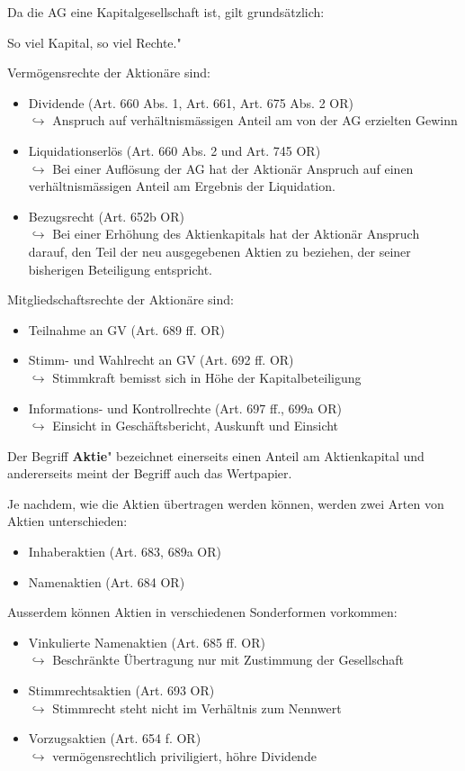 \documentclass[12pt]{article}
\begin{document}
Da die AG eine Kapitalgesellschaft ist, gilt grundsätzlich: 
\begin{center}
    \glqq So viel Kapital, so viel Rechte."
\end{center}
Vermögensrechte der Aktionäre sind:
\begin{itemize}
    \item Dividende (Art. 660 Abs. 1, Art. 661, Art. 675 Abs. 2 OR)\\
    $\hookrightarrow$ Anspruch auf verhältnismässigen Anteil am von der AG erzielten Gewinn
    \item Liquidationserlös (Art. 660 Abs. 2 und Art. 745 OR)\\
    $\hookrightarrow$ Bei einer Auflösung der AG hat der Aktionär Anspruch auf einen verhältnismässigen Anteil am Ergebnis der Liquidation.
    \item Bezugsrecht (Art. 652b OR)\\
    $\hookrightarrow$ Bei einer Erhöhung des Aktienkapitals hat der Aktionär Anspruch darauf, den Teil der neu ausgegebenen Aktien zu beziehen, der seiner bisherigen Beteiligung entspricht.
\end{itemize}
\newpage
Mitgliedschaftsrechte der Aktionäre sind:
\begin{itemize}
    \item Teilnahme an GV (Art. 689 ff. OR)
    \item Stimm- und Wahlrecht an GV (Art. 692 ff. OR)\\
    $\hookrightarrow$ Stimmkraft bemisst sich in Höhe der Kapitalbeteiligung
    \item Informations- und Kontrollrechte (Art. 697 ff., 699a OR)\\
    $\hookrightarrow$ Einsicht in Geschäftsbericht, Auskunft und Einsicht
\end{itemize}
\begin{Definitionsbox}
    Der Begriff \glqq\textbf{Aktie}" bezeichnet einerseits einen Anteil am Aktienkapital und andererseits meint der Begriff auch das Wertpapier.
\end{Definitionsbox}
Je nachdem, wie die Aktien übertragen werden können, werden zwei Arten von Aktien unterschieden:
\begin{itemize}
    \item Inhaberaktien (Art. 683, 689a OR)
    \item Namenaktien (Art. 684 OR)
\end{itemize}
Ausserdem können Aktien in verschiedenen Sonderformen vorkommen:
\begin{itemize}
    \item Vinkulierte Namenaktien (Art. 685 ff. OR)\\
    $\hookrightarrow$ Beschränkte Übertragung nur mit Zustimmung der Gesellschaft
    \item Stimmrechtsaktien (Art. 693 OR)\\
    $\hookrightarrow$ Stimmrecht steht nicht im Verhältnis zum Nennwert
    \item Vorzugsaktien (Art. 654 f. OR)\\
    $\hookrightarrow$ vermögensrechtlich priviligiert, höhre Dividende
\end{itemize}
\end{document}
